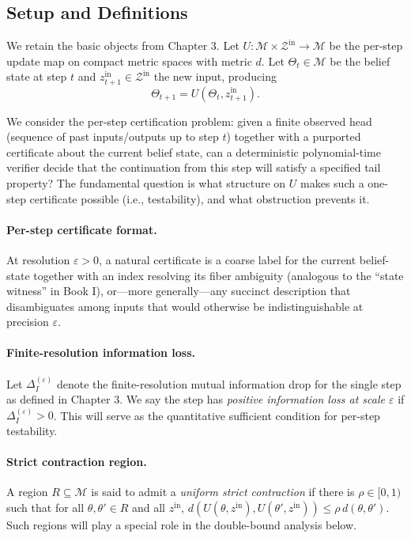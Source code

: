 \documentclass[12pt]{article}
\theoremstyle{definition}
\theoremstyle{plain}
\begin{document}
\subsection{Setup and Definitions}

We retain the basic objects from Chapter 3.  Let \(U:\mathcal{M}\times\mathcal{Z}^{\mathrm{in}}\to\mathcal{M}\) be the per-step update map on compact metric spaces with metric \(d\).  Let \(\Theta_t\in\mathcal{M}\) be the belief state at step \(t\) and \(z_{t+1}^{\mathrm{in}}\in\mathcal{Z}^{\mathrm{in}}\) the new input, producing
\[
\Theta_{t+1} = U(\Theta_t, z_{t+1}^{\mathrm{in}}).
\]

We consider the per-step certification problem: given a finite observed head (sequence of past inputs/outputs up to step \(t\)) together with a purported certificate about the current belief state, can a deterministic polynomial-time verifier decide that the continuation from this step will satisfy a specified tail property?  The fundamental question is what structure on \(U\) makes such a one-step certificate possible (i.e., testability), and what obstruction prevents it.

\paragraph{Per-step certificate format.} At resolution \(\varepsilon>0\), a natural certificate is a coarse label for the current belief-state together with an index resolving its fiber ambiguity (analogous to the ``state witness'' in Book I), or—more generally—any succinct description that disambiguates among inputs that would otherwise be indistinguishable at precision \(\varepsilon\).

\paragraph{Finite-resolution information loss.} Let \(\Delta_I^{(\varepsilon)}\) denote the finite-resolution mutual information drop for the single step as defined in Chapter 3. We say the step has \emph{positive information loss at scale \(\varepsilon\)} if \(\Delta_I^{(\varepsilon)}>0\).  This will serve as the quantitative sufficient condition for per-step testability.

\paragraph{Strict contraction region.} A region \(R\subseteq\mathcal{M}\) is said to admit a \emph{uniform strict contraction} if there is \(\rho\in[0,1)\) such that for all \(\theta,\theta'\in R\) and all \(z^{\mathrm{in}}\), \(d(U(\theta,z^{\mathrm{in}}),U(\theta',z^{\mathrm{in}}))\le \rho\,d(\theta,\theta')\).  Such regions will play a special role in the double-bound analysis below.
\end{document}
